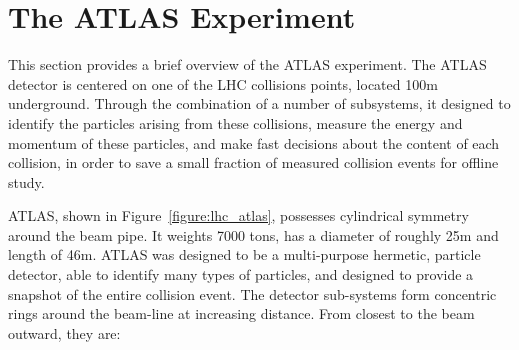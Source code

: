 \section{The ATLAS Experiment}

This section provides a brief overview of the ATLAS experiment. The ATLAS detector
is centered on one of the LHC collisions points, located 100m underground. Through
the combination of a number of subsystems, it designed to identify the 
particles arising from these collisions, measure the energy and momentum  
of these particles, and make fast decisions about the content
of each collision, in order to save a small fraction of measured collision events
for offline study. 

ATLAS, shown in Figure~\ref{figure:lhc_atlas},  possesses cylindrical symmetry around the beam pipe. It weights 7000 tons,
has a diameter of roughly 25m and length of 46m. ATLAS was designed to be a multi-purpose
hermetic, particle detector, able to identify many types of particles, and designed to provide
a snapshot of the entire collision event. The detector sub-systems form concentric rings 
around the beam-line at increasing distance. From closest to the beam outward, they are:

